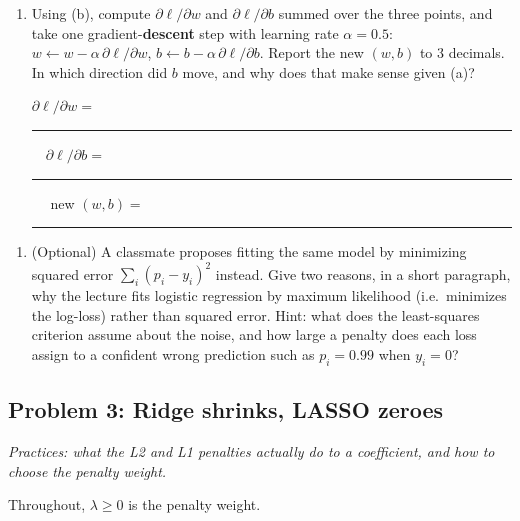 \documentclass[
  11pt,
]{article}
\providecommand{\tightlist}{%
  \setlength{\itemsep}{0pt}\setlength{\parskip}{0pt}}
\newcommand{\answerspace}[1]{\par\vspace*{#1}}  %
\newcommand{\blank}[1][1.2in]{\rule{#1}{0.4pt}}
\newcommand{\answerpage}{\clearpage}
\begin{document}
\answerspace{3.5in}

\begin{enumerate}
\def\labelenumi{(\alph{enumi})}
\setcounter{enumi}{2}
\item
  Using (b), compute \(\partial\ell/\partial w\) and
  \(\partial\ell/\partial b\) summed over the three points, and take one
  gradient-\textbf{descent} step with learning rate \(\alpha = 0.5\):
  \(w \leftarrow w - \alpha\,\partial\ell/\partial w\),
  \(b \leftarrow b - \alpha\,\partial\ell/\partial b\). Report the new
  \((w, b)\) to 3 decimals. In which direction did \(b\) move, and why
  does that make sense given (a)?

  \(\partial\ell/\partial w =\)
  \blank[0.8in] \(\quad \partial\ell/\partial b =\)
  \blank[0.8in] \(\quad\) new \((w, b) =\) \blank[1.5in]
\end{enumerate}

\answerspace{2.5in}
\answerpage

\begin{enumerate}
\def\labelenumi{(\alph{enumi})}
\setcounter{enumi}{3}
\tightlist
\item
  (Optional) A classmate proposes fitting the same model by minimizing
  squared error \(\sum_i (p_i - y_i)^2\) instead. Give two reasons, in a
  short paragraph, why the lecture fits logistic regression by maximum
  likelihood (i.e.~minimizes the log-loss) rather than squared error.
  Hint: what does the least-squares criterion assume about the noise,
  and how large a penalty does each loss assign to a confident wrong
  prediction such as \(p_i = 0.99\) when \(y_i = 0\)?
\end{enumerate}

\answerspace{1.8in}

\answerpage

\subsection{Problem 3: Ridge shrinks, LASSO
zeroes}\label{problem-3-ridge-shrinks-lasso-zeroes}

\emph{Practices: what the L2 and L1 penalties actually do to a
coefficient, and how to choose the penalty weight.}

Throughout, \(\lambda \ge 0\) is the penalty weight.
\end{document}
